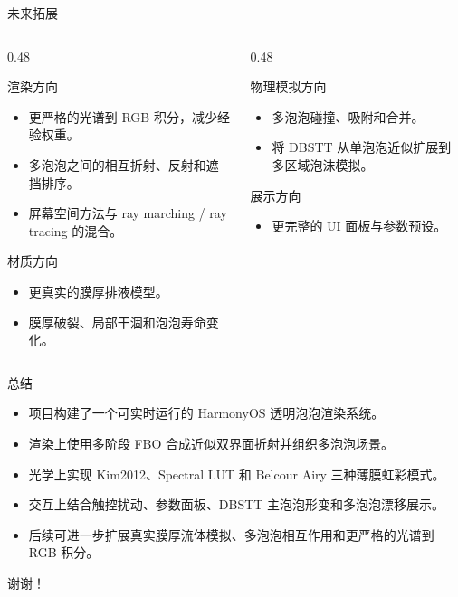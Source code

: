 \documentclass[11pt,aspectratio=169]{beamer}
\begin{document}
\begin{frame}{未来拓展}
  \begin{columns}[T]
    \begin{column}{0.48\linewidth}
      \begin{block}{渲染方向}
        \begin{itemize}
          \item 更严格的光谱到 RGB 积分，减少经验权重。
          \item 多泡泡之间的相互折射、反射和遮挡排序。
          \item 屏幕空间方法与 ray marching / ray tracing 的混合。
        \end{itemize}
      \end{block}
      \begin{block}{材质方向}
        \begin{itemize}
          \item 更真实的膜厚排液模型。
          \item 膜厚破裂、局部干涸和泡泡寿命变化。
        \end{itemize}
      \end{block}
    \end{column}
    \begin{column}{0.48\linewidth}
      \begin{block}{物理模拟方向}
        \begin{itemize}
          \item 多泡泡碰撞、吸附和合并。
          \item 将 DBSTT 从单泡泡近似扩展到多区域泡沫模拟。
        \end{itemize}
      \end{block}
      \begin{block}{展示方向}
        \begin{itemize}
          \item 更完整的 UI 面板与参数预设。
        \end{itemize}
      \end{block}
    \end{column}
  \end{columns}
\end{frame}

\begin{frame}{总结}
  \begin{itemize}
    \item 项目构建了一个可实时运行的 HarmonyOS 透明泡泡渲染系统。
    \item 渲染上使用多阶段 FBO 合成近似双界面折射并组织多泡泡场景。
    \item 光学上实现 Kim2012、Spectral LUT 和 Belcour Airy 三种薄膜虹彩模式。
    \item 交互上结合触控扰动、参数面板、DBSTT 主泡泡形变和多泡泡漂移展示。
    \item 后续可进一步扩展真实膜厚流体模拟、多泡泡相互作用和更严格的光谱到 RGB 积分。
  \end{itemize}
  \vspace{0.8em}
  \centering
  \Large 谢谢！
\end{frame}
\end{document}
